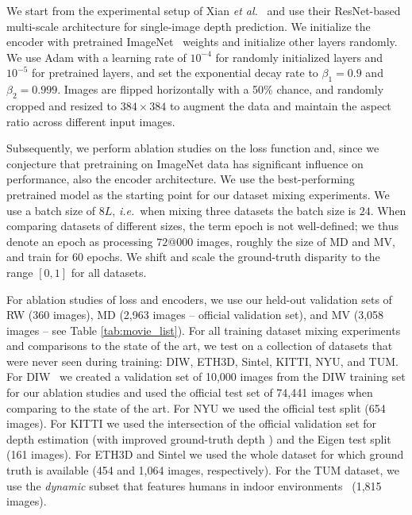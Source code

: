 \newcommand{\changedt}[1] {#1}
\newcommand{\changedg}[1] {\color{Green}#1}
\newcommand{\changedr}[1] {\color{Red}#1}
\def\Uline#1{#1\llap{\uline{\phantom{11.11}}}}

We start from the experimental setup of Xian \MakeLowercase{\textit{et al.}}~\cite{Xian2018} and use their ResNet-based \cite{He2016} multi-scale architecture for single-image depth prediction. We initialize the encoder with pretrained ImageNet~\cite{Deng2009} weights and initialize other layers randomly. We use Adam \cite{Kingma2015} with a learning rate of $10^{-4}$ for randomly initialized layers and $10^{-5}$ for pretrained layers, and set the exponential decay rate to $\beta_1 = 0.9$ and $\beta_2= 0.999$. Images are flipped horizontally with a 50\% chance, and randomly cropped and resized to $384\times384$ to augment the data and maintain the aspect ratio across different input images. 

Subsequently, we perform ablation studies on the loss function and, since we conjecture that pretraining on ImageNet data has significant influence on performance, also the encoder architecture. We use the best-performing pretrained model as the starting point for our dataset mixing experiments. We use a batch size of $8L$, \MakeLowercase{\textit{i.e.}}\ when mixing three datasets the batch size is $24$. When comparing datasets of different sizes, the term epoch is not well-defined; we thus denote an epoch as processing $72@000$ images, roughly the size of MD and MV, and train for $60$ epochs. We shift and scale the ground-truth disparity to the range $[0,1]$ for all datasets.

 For ablation studies of loss and encoders, we use our held-out validation sets of RW (360 images), MD (2,963 images -- official validation set), and MV (3,058 images -- see Table \ref{tab:movie_list}).
For all training dataset mixing experiments and comparisons to the state of the art, we test on a collection of datasets that were never seen during training: DIW, ETH3D, Sintel, KITTI, NYU, and TUM. For DIW~\cite{Chen2016} we created a validation set of 10,000 images from the DIW training set for our ablation studies and used the official test set of 74,441 images when comparing to the state of the art. For NYU we used the official test split (654 images). For KITTI we used the intersection of the official validation set for depth estimation (with improved ground-truth depth \cite{Uhrig2017}) and the Eigen test split~\cite{EigenFergus2015} (161 images). For ETH3D and Sintel we used the whole dataset for which ground truth is available (454 and 1,064 images, respectively). For the TUM dataset, we use the \textit{dynamic} subset that features humans in indoor environments~\cite{Li2019} (1,815 images).

